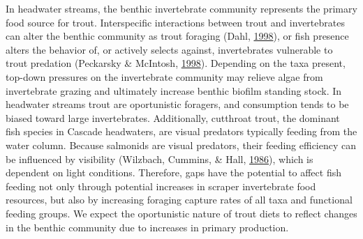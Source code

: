 \documentclass[double,12pt]{beavtex}
\begin{document}
  In headwater streams, the benthic invertebrate community represents the
  primary food source for trout. Interspecific interactions between trout
  and invertebrates can alter the benthic community as trout foraging
  (Dahl, \protect\hyperlink{ref-Dahl1998}{1998}), or fish presence alters
  the behavior of, or actively selects against, invertebrates vulnerable
  to trout predation (Peckarsky \& McIntosh,
  \protect\hyperlink{ref-Peckarsky1998}{1998}). Depending on the taxa
  present, top-down pressures on the invertebrate community may relieve
  algae from invertebrate grazing and ultimately increase benthic biofilm
  standing stock. In headwater streams trout are oportunistic foragers,
  and consumption tends to be biased toward large invertebrates.
  Additionally, cutthroat trout, the dominant fish species in Cascade
  headwaters, are visual predators typically feeding from the water
  column. Because salmonids are visual predators, their feeding efficiency
  can be influenced by visibility (Wilzbach, Cummins, \& Hall,
  \protect\hyperlink{ref-Wilzbach1986}{1986}), which is dependent on light
  conditions. Therefore, gaps have the potential to affect fish feeding
  not only through potential increases in scraper invertebrate food
  resources, but also by increasing foraging capture rates of all taxa and
  functional feeding groups. We expect the oportunistic nature of trout
  diets to reflect changes in the benthic community due to increases in
  primary production.
  
\end{document}
